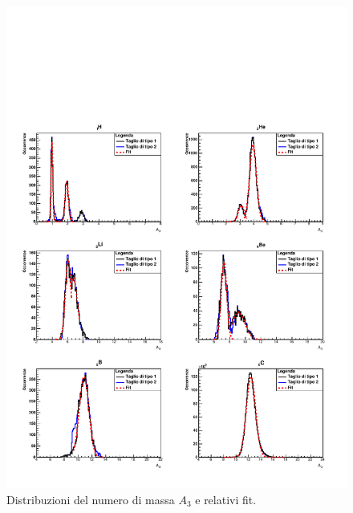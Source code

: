 \documentclass[12pt,a4paper,twoside]{report}
\begin{document}
	\begin{figure}[H]
		\centering
		\includegraphics[width=1.\linewidth]{c_Total_black_blue3.pdf}
		\caption{Distribuzioni del numero di massa $A_3$ e relativi fit.}
		\label{fig:a3_fragments_final}
	\end{figure}
\end{document}

